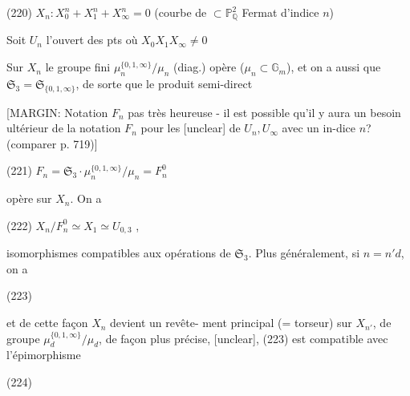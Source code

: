 (220) $X_n : X_0^n + X_1^n + X_\infty^n = 0$ \qquad \qquad (courbe de
$\subset \mathbb{P}^2_{\mathbb{Q}}$ \qquad \qquad \qquad \qquad Fermat d'indice $n$)

Soit $U_n$ l'ouvert des pts où $X_0 X_1 X_\infty \neq 0$

Sur $X_n$ le groupe fini $\mu_n^{\{0,1,\infty\}} / \mu_n$ (diag.)
opère ($\mu_n \subset \mathbb{G}_m$), et on a aussi
que $\mathfrak{S}_3 = \mathfrak{S}_{\{0,1,\infty\}}$, de sorte que le
produit semi-direct

[MARGIN: Notation $F_n$ pas très heureuse - il est possible qu'il y aura un besoin ultérieur de la notation $F_n$ pour les [unclear] de $U_n, U_\infty$ avec un in-dice $n$? (comparer p. 719)]

(221) $F_n = \mathfrak{S}_3 \cdot \mu_n^{\{0,1,\infty\}} / \mu_n = F_n^0$

opère sur $X_n$.
On a

(222) $X_n / F_n^0 \simeq X_1 \simeq U_{0,3}$ ,

isomorphismes compatibles aux opérations de
$\mathfrak{S}_3$. Plus généralement, si
$n = n'd$, on a

(223)

et de cette façon $X_n$ devient un revête-
ment principal (= torseur) sur $X_{n'}$, de
groupe $\mu_d^{\{0,1,\infty\}} / \mu_d$, de façon plus précise,
[unclear], (223) est compatible avec
l'épimorphisme

(224)

\newpage


